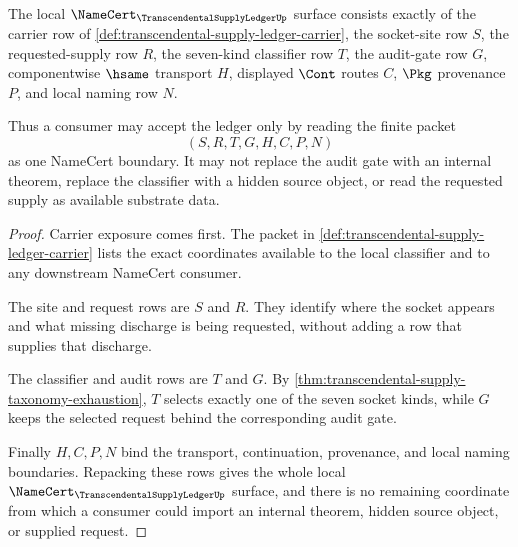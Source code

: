 \begin{theorem}
\label{thm:transcendental-supply-namecert-obligation-surface}
The local $\NameCert_{\TranscendentalSupplyLedgerUp}$ surface consists exactly of the carrier row of \autoref{def:transcendental-supply-ledger-carrier}, the socket-site row $S$, the requested-supply row $R$, the seven-kind classifier row $T$, the audit-gate row $G$, componentwise $\hsame$ transport $H$, displayed $\Cont$ routes $C$, $\Pkg$ provenance $P$, and local naming row $N$.

Thus a consumer may accept the ledger only by reading the finite packet
$$
(S,R,T,G,H,C,P,N)
$$
as one NameCert boundary. It may not replace the audit gate with an internal theorem, replace the classifier with a hidden source object, or read the requested supply as available substrate data.
\end{theorem}
\begin{proof}
Carrier exposure comes first. The packet in \autoref{def:transcendental-supply-ledger-carrier} lists the exact coordinates available to the local classifier and to any downstream NameCert consumer.

The site and request rows are $S$ and $R$. They identify where the socket appears and what missing discharge is being requested, without adding a row that supplies that discharge.

The classifier and audit rows are $T$ and $G$. By \autoref{thm:transcendental-supply-taxonomy-exhaustion}, $T$ selects exactly one of the seven socket kinds, while $G$ keeps the selected request behind the corresponding audit gate.

Finally $H,C,P,N$ bind the transport, continuation, provenance, and local naming boundaries. Repacking these rows gives the whole local $\NameCert_{\TranscendentalSupplyLedgerUp}$ surface, and there is no remaining coordinate from which a consumer could import an internal theorem, hidden source object, or supplied request.
\end{proof}


